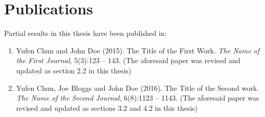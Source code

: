 

%
%

\chapter*{Publications}

Partial results in this thesis have been published in:

\begin{enumerate}
\item Yufen Chun and John Doe (2015). The Title of the First Work. {\slshape The Name of the First Journal}, 5(3):123 -- 143. (The aforesaid paper was revised and updated as section 2.2 in this thesis)
\item Yufen Chun, Joe Bloggs and John Doe (2016). The Title of the Second work.   {\slshape The Name of the Second Journal}, 6(8):1123 -- 1143. (The aforesaid paper was revised and updated as sections 3.2 and 4.2 in this thesis)
\end{enumerate}
